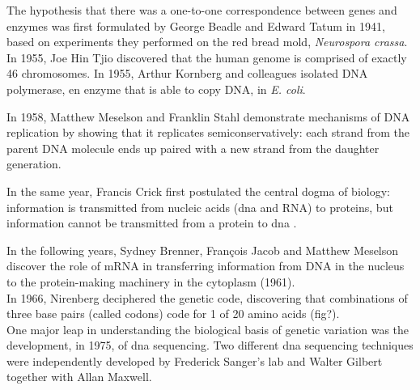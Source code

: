 The hypothesis that there was a one-to-one correspondence between genes and enzymes was first formulated by George Beadle and Edward Tatum in 1941, based on experiments they performed on the red bread mold, \textit{Neurospora crassa}.\\


In 1955, Joe Hin Tjio discovered that the human genome is comprised of exactly 46 chromosomes.
In 1955, Arthur Kornberg and colleagues isolated DNA polymerase, en enzyme that is able to copy DNA, in \textit{E. coli}.

In 1958, Matthew Meselson and Franklin Stahl demonstrate mechanisms of DNA replication by showing that it replicates semiconservatively: each strand from the parent DNA molecule ends up paired with a new strand from the daughter generation.

In the same year, Francis Crick first postulated the central dogma of biology: information is transmitted from nucleic acids (\gls{dna} and RNA) to proteins, but information cannot be transmitted from a protein to \gls{dna} \cite{crick1958protein}. 

In the following years, Sydney Brenner, François Jacob and Matthew Meselson discover the role of mRNA in transferring information from DNA in the nucleus to the protein-making machinery in the cytoplasm (1961).\\

In 1966, Nirenberg deciphered the genetic code, discovering that combinations of three base pairs (called codons) code for 1 of 20 amino acids (fig?).
\\

One major leap in understanding the biological basis of genetic variation was the development, in 1975, of \gls{dna} sequencing. 
Two different \gls{dna} sequencing techniques were independently developed by Frederick Sanger's lab and Walter Gilbert together with Allan Maxwell.\\

